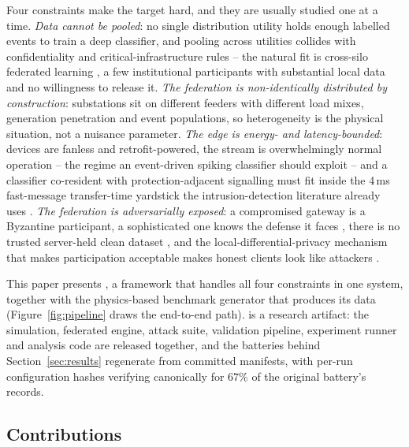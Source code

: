Four constraints make the target hard, and they are usually studied one
at a time. \emph{Data cannot be pooled}: no single distribution utility
holds enough labelled events to train a deep classifier, and pooling
across utilities collides with confidentiality and
critical-infrastructure rules -- the natural fit is cross-silo federated
learning \cite{mcmahan2017}, a few institutional participants with
substantial local data and no willingness to release it. \emph{The
federation is non-identically distributed by construction}: substations
sit on different feeders with different load mixes, generation
penetration and event populations, so heterogeneity is the physical
situation, not a nuisance parameter. \emph{The edge is energy- and
latency-bounded}: devices are fanless and retrofit-powered, the stream is
overwhelmingly normal operation -- the regime an event-driven spiking
classifier should exploit \cite{eshraghian2023,horowitz2014} -- and a
classifier co-resident with protection-adjacent signalling must fit
inside the 4\,ms fast-message transfer-time yardstick the
intrusion-detection literature already uses
\cite{ustun2021,moore2026}. \emph{The federation is adversarially
exposed}: a compromised gateway is a Byzantine participant, a
sophisticated one knows the defense it faces \cite{fang2020,shejwalkar2021},
there is no trusted server-held clean dataset \cite{cao2021fltrust}, and
the local-differential-privacy mechanism that makes participation
acceptable makes honest clients look like attackers
\cite{guerraoui2021podc}.

This paper presents \sysname, a framework that handles all four
constraints in one system, together with the physics-based benchmark
generator that produces its data (Figure~\ref{fig:pipeline} draws the
end-to-end path). \sysname{} is a research artifact: the
simulation, federated engine, attack suite, validation pipeline,
experiment runner and analysis code are released together, and the
batteries behind Section~\ref{sec:results} regenerate from committed
manifests, with per-run configuration hashes verifying canonically for
$67\%$ of the original battery's records.

\subsection{Contributions}
\label{sec:contributions}

